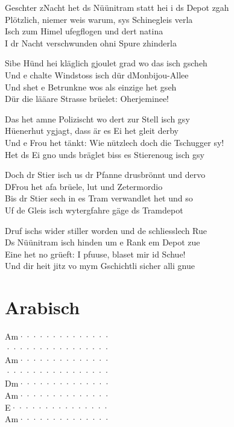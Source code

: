 \documentclass[
  letterpaper,
  a5paper]{memoir}
\begin{document}
Geschter z\textquotesingle Nacht het ds Nüünitram statt hei i ds Depot
z\textquotesingle gah\\
Plötzlich, niemer weis warum, sys Schinegleis verla\\
Isch zum Himel ufegflogen und dert natina\\
I dr Nacht verschwunden ohni Spure z\textquotesingle hinderla

Sibe Hünd hei kläglich gjoulet grad wo das isch gscheh\\
Und e chalte Windstoss isch dür d\textquotesingle Monbijou-Allee\\
Und s\textquotesingle het e Betrunkne wos als einzige het gseh\\
Dür die lääare Strasse brüelet: Oherjeminee!

Das het amne Polizischt wo dert zur Stell isch gsy\\
Hüenerhut ygjagt, dass är es Ei het gleit derby\\
Und e Frou het tänkt: Wie nützlech doch die Tschugger sy!\\
Het ds Ei gno und\textquotesingle s bräglet bis\textquotesingle s es
Stierenoug isch gsy

Doch dr Stier isch us dr Pfanne drusbrönnt und dervo\\
D\textquotesingle Frou het afa brüele, lut und Zetermordio\\
Bis dr Stier sech in es Tram verwandlet het und so\\
Uf de Gleis isch wytergfahre gäge ds Tramdepot

Druf ischs wider stiller worden und de schliesslech Rue\\
Ds Nüünitram isch hinden um e Rank em Depot zue\\
Eine het no grüeft: I pfuuse, blaset mir id Schue!\\
Und dir heit jitz vo mym Gschichtli sicher alli gnue

\hypertarget{arabisch}{%
\chapter{Arabisch}\label{arabisch}}

\textbar Am······\textbar········\textbar{}\\
\textbar········\textbar········\textbar{}\\
\textbar Am······\textbar········\textbar{}\\
\textbar········\textbar········\textbar{}\\
\textbar Dm······\textbar········\textbar{}\\
\textbar Am······\textbar········\textbar{}\\
\textbar E·······\textbar········\textbar{}\\
\textbar Am······\textbar········\textbar{}
\end{document}
